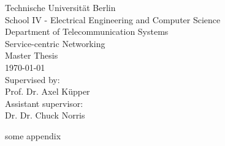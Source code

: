 \documentclass[twoside,11pt,titlepage,a4paper,english,bibliography=totocnumbered,listof=numbered]{scrbook}
\begin{document}
\begin{titlepage}
\begin{center}
		Technische Universität Berlin\\
		School IV - Electrical Engineering and Computer Science\\
		Department of Telecommunication Systems\\
		Service-centric Networking\\
		\vspace{0.5cm}
		Master Thesis\\
		\vspace{2.2cm}
		\today\\
		\vspace{2.0cm}
		\large
		Supervised by:\\
		Prof. Dr. Axel Küpper\\
		\vspace{1cm}
		Assistant supervisor:\\
		Dr. Dr. Chuck Norris
		\end{center}
\end{titlepage}
\thispagestyle{empty}

\cleardoublepage

\newpage



\thispagestyle{empty}

\tableofcontents{\thispagestyle{empty}}

\mainmatter








\backmatter

\listoftables
\listoffigures

\setwidesite{}						%

\label{cha:bibliography}
\printbibliography

\begin{appendices}

some appendix

\end{appendices}
\end{document}
